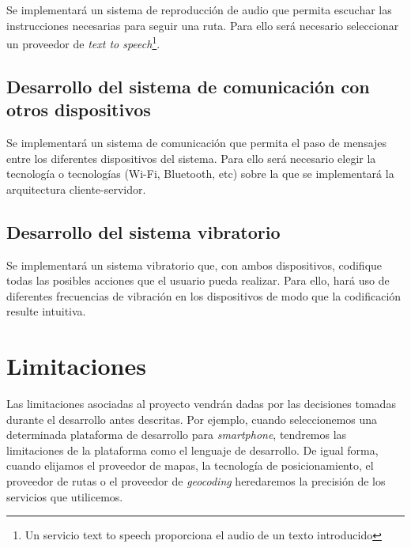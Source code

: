 Se implementará un sistema de reproducción de audio que permita escuchar las instrucciones
necesarias para seguir una ruta. Para ello será necesario seleccionar un proveedor de \emph{text to
  speech}\footnote{Un servicio text to speech proporciona el audio de un texto introducido}.

\subsection{Desarrollo del sistema de comunicación con otros dispositivos}

Se implementará un sistema de comunicación que permita el paso de mensajes entre los diferentes
dispositivos del sistema. Para ello será necesario elegir la tecnología o tecnologías (Wi-Fi,
Bluetooth, etc) sobre la que se implementará la arquitectura cliente-servidor.

\subsection{Desarrollo del sistema vibratorio}

Se implementará un sistema vibratorio que, con ambos dispositivos, codifique todas las posibles
acciones que el usuario pueda realizar. Para ello, hará uso de diferentes frecuencias de vibración en los dispositivos de modo que la codificación resulte intuitiva.

\section{Limitaciones}

Las limitaciones asociadas al proyecto vendrán dadas por las decisiones tomadas durante el
desarrollo antes descritas. Por ejemplo, cuando seleccionemos una determinada plataforma de
desarrollo para \emph{smartphone}, tendremos las limitaciones de la plataforma como el lenguaje de
desarrollo. De igual forma, cuando elijamos el proveedor de mapas, la tecnología de posicionamiento,
el proveedor de rutas o el proveedor de \emph{geocoding} heredaremos la precisión de los servicios
que utilicemos.

